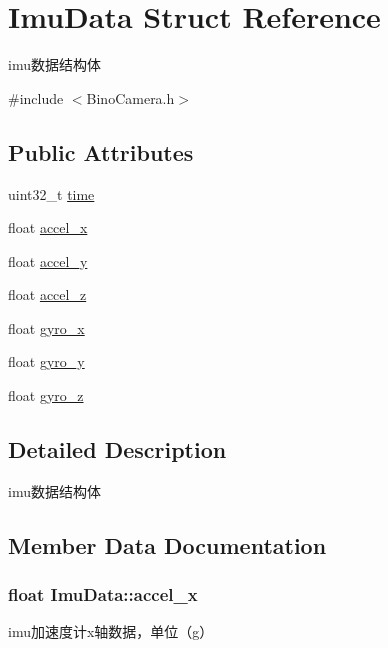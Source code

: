 \hypertarget{structImuData}{}\section{Imu\+Data Struct Reference}
\label{structImuData}


imu数据结构体  




{\ttfamily \#include $<$Bino\+Camera.\+h$>$}

\subsection*{Public Attributes}
\begin{DoxyCompactItemize}
\item 
uint32\+\_\+t \hyperlink{structImuData_a6677f5c89b3ceed1830c6a3cf5e66285}{time}
\item 
float \hyperlink{structImuData_ab0a1374aff9f7988812811f6e453c123}{accel\+\_\+x}
\item 
float \hyperlink{structImuData_abfc7185440169b8ef2571f9df60741b5}{accel\+\_\+y}
\item 
float \hyperlink{structImuData_a0c86f254f9f528e174e9ea7779eb2e99}{accel\+\_\+z}
\item 
float \hyperlink{structImuData_a7693a5307463d99e37530abc5f3ec8ec}{gyro\+\_\+x}
\item 
float \hyperlink{structImuData_a9cb9ff8ceb19f95af9a2c1144d167067}{gyro\+\_\+y}
\item 
float \hyperlink{structImuData_a1f5297d4e01240a47f0c4a8338a9df5f}{gyro\+\_\+z}
\end{DoxyCompactItemize}


\subsection{Detailed Description}
imu数据结构体 

\subsection{Member Data Documentation}
\subsubsection[{\texorpdfstring{accel\+\_\+x}{accel_x}}]{\setlength{\rightskip}{0pt plus 5cm}float Imu\+Data\+::accel\+\_\+x}\hypertarget{structImuData_ab0a1374aff9f7988812811f6e453c123}{}\label{structImuData_ab0a1374aff9f7988812811f6e453c123}
imu加速度计x轴数据，单位（g） 
